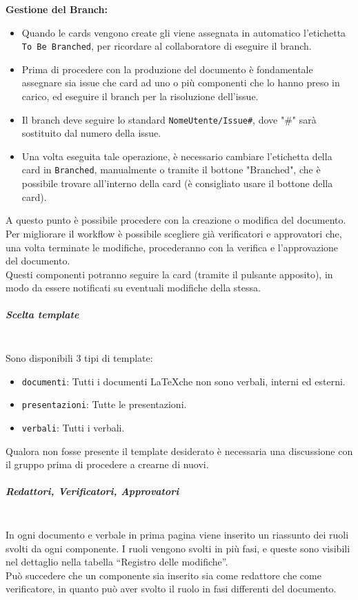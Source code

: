 \noindent \textbf{Gestione del Branch:}
\begin{itemize}
    \item Quando le cards vengono create gli viene assegnata in automatico 
    l'etichetta \texttt{To Be Branched}, per ricordare al collaboratore di 
    eseguire il branch.
    \item Prima di procedere con la produzione del documento è fondamentale 
    assegnare sia issue che card ad uno o più componenti che lo hanno preso in carico, 
    ed eseguire il branch per la risoluzione dell'issue.
    \item Il branch deve seguire lo standard \texttt{NomeUtente/Issue\#}, 
    dove "\#" sarà sostituito dal numero della issue.
    \item Una volta eseguita tale operazione, è necessario cambiare l'etichetta 
    della card in \texttt{Branched}, manualmente o tramite il 
    bottone "Branched", che è possibile trovare all'interno della card (è consigliato usare il bottone della card).
\end{itemize}
\noindent A questo punto è possibile procedere con la creazione o modifica del documento.
Per migliorare il workflow è possibile scegliere già verificatori e 
approvatori che, una volta terminate le modifiche, procederanno con la 
verifica e l'approvazione del documento.\\ 
Questi componenti potranno seguire la card (tramite il pulsante apposito), 
in modo da essere notificati su eventuali modifiche della stessa.

\subparagraph{Scelta template}
\mbox{}\\
Sono disponibili 3 tipi di template:
\begin{itemize}
    \item \texttt{documenti}: Tutti i documenti \LaTeX che non sono verbali, interni ed esterni.
    \item \texttt{presentazioni}: Tutte le presentazioni.
    \item \texttt{verbali}: Tutti i verbali.
\end{itemize}
Qualora non fosse presente il template desiderato è necessaria una discussione con il gruppo prima di procedere a crearne di nuovi.

\subparagraph{Redattori, Verificatori, Approvatori}
\mbox{}\\
In ogni documento e verbale in prima pagina viene inserito un riassunto dei ruoli svolti da ogni componente. 
I ruoli vengono svolti in più fasi, e queste sono visibili nel dettaglio nella tabella ``Registro delle modifiche''.\\ 
Può succedere che un componente sia inserito sia come redattore che come verificatore, in quanto può aver svolto il ruolo in fasi differenti del documento.

